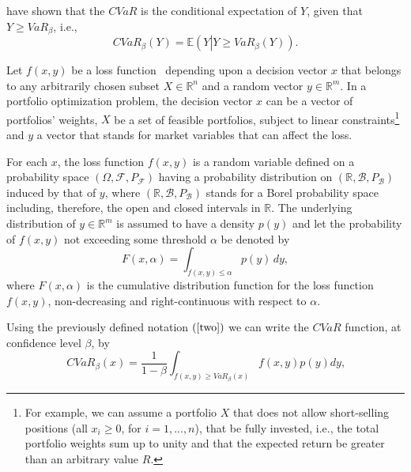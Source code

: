 \documentclass[a4paper,10pt]{article}
\begin{document}
\bigskip \citet*{uryasev1999} have shown that the $CVaR$ is the conditional
expectation of $Y$, given that $Y\geq VaR_{\beta }$, i.e.,
\begin{equation}
CVaR_{\beta }\left( Y\right) =\mathbb{E}\left( Y\left\vert Y\geq VaR_{\beta
}\left( Y\right) \right. \right) .  \label{three}
\end{equation}

Let $f\left( x,y\right) $ be a loss function \ depending upon a decision
vector $x$ that belongs to any arbitrarily chosen subset $X\in
\mathbb{R}
^{n}$ and a random vector $y\in
\mathbb{R}
^{m}$. In a portfolio optimization problem, the decision vector $x$ can be a
vector of portfolios' weights, $X$ be a set of feasible portfolios,
subject to linear constraints\footnote{%
	For example, we can assume a portfolio $X$ that does not allow short-selling positions (all $x_{i}\geq 0$, for $i=1,...,n$),
	that be fully invested, i.e., the total portfolio weights sum
	up to unity and that the expected return be greater than an arbitrary value $%
	R$.} and $y$ a vector that stands for market variables that can affect the loss.

\bigskip

For each $x$, the loss function $f\left( x,y\right) $ is a random variable
defined on a probability space $\left( \Omega ,\mathcal{F},P_{\mathcal{F}%
}\right) $ having a probability distribution on $\left(
\mathbb{R}
,\mathcal{B},P_{\mathcal{B}}\right) $ induced by that of $y$, where $\left(
\mathbb{R}
,\mathcal{B},P_{\mathcal{B}}\right) $ stands for a Borel probability space
including, therefore, the open and closed intervals in $%
\mathbb{R}
$. The underlying distribution of $y\in
\mathbb{R}
^{m}$ is assumed to have a density $p(y)$ and let the probability of $f\left( x,y\right) $ not exceeding some threshold $\alpha$ be denoted by
\begin{equation}
F(x,\alpha)=\int_{f(x,y)\leq \alpha}p(y)\,dy,  \label{four}
\end{equation}
where $F(x,\alpha)$ is the cumulative distribution function for the loss function $f\left( x,y\right) $, non-decreasing and right-continuous with respect to $\alpha$.

Using the previously defined notation $\left( \ref{two}\right) $ we can
write the $CVaR$ function, at confidence level $\beta $, by%
\begin{equation}
CVaR_{\beta }\left( x\right) = \frac{1}{1-\beta }\int_{f(x,y)\geq VaR_{\beta
	}\left( x\right) }f(x,y)p(y)dy\text{,}  \label{five}
\end{equation}
\end{document}
